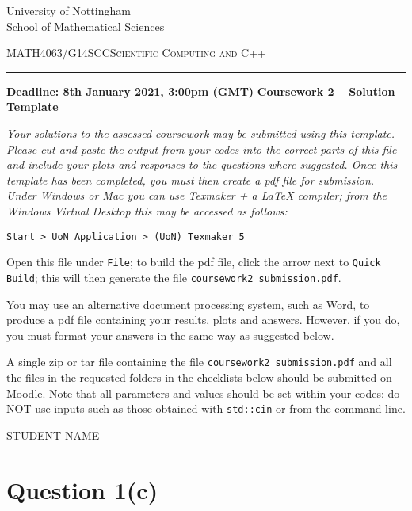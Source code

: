 \documentclass[a4,10pt,fleqn]{article}  %
\begin{document}
\thispagestyle{empty}
\begin{center}
University of Nottingham\\
School of Mathematical Sciences
\end{center}
\large\textsc {MATH4063/G14SCC}\hfill\large\textsc {Scientific Computing and C++}%
\vspace*{2ex}
\hrule
\vskip0.25cm
\textbf{Deadline: 8th January 2021, 3:00pm (GMT)}
\hfill \textbf{Coursework 2 -- Solution Template}\\

\noindent 
{\em Your solutions to the assessed coursework may be submitted using this template.
Please cut and paste the output from your codes into the correct parts of this file
and include your plots and responses to the questions where suggested. Once this
template has been completed, you must then create a pdf file for submission. Under
Windows or Mac you can use Texmaker + a LaTeX compiler; from the Windows Virtual
Desktop this may be accessed as follows:
\begin{verbatim}
Start > UoN Application > (UoN) Texmaker 5
\end{verbatim}
Open this file under {\tt File}; to build the pdf file, click the arrow next to
{\tt Quick Build}; this will then generate the file {\tt coursework2\_submission.pdf}. 

\vspace{2mm}
 You may use an alternative document processing system, such as Word, to produce
a pdf file containing your results, plots and answers. However, if you do, you must
format your answers in the same way as suggested below.

\vspace{2mm}
 A single zip or tar file containing the file {\tt coursework2\_submission.pdf}
and all the files in the requested folders in the checklists below should be
submitted on Moodle. Note that all parameters and values should be set within
your codes: do NOT use inputs such as those obtained with {\tt std::cin} or from
the command line.
}

\vspace{25mm}
\centerline{\LARGE STUDENT NAME}

\clearpage

\section*{Question 1(c)}
\end{document}
